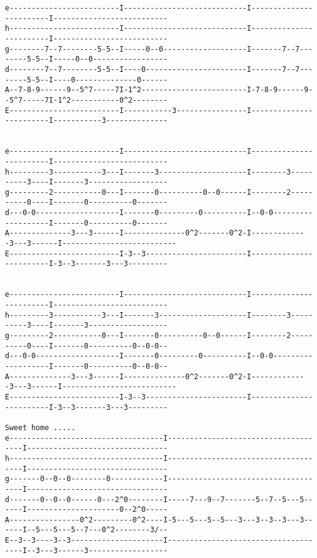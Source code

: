 \begin{verbatim}
e-------------------------I----------------------------I------------------------I--------------------------
h-------------------------I----------------------------I------------------------I--------------------------
g--------7--7--------5-5--I-----0--0-------------------I-------7--7--------5-5--I-----0--0-----------------
d--------7--7--------5-5--I----0-----------------------I-------7--7--------5-5--I----0--------------0------
A--7-8-9------9--5^7-----7I-1^2------------------------I-7-8-9------9--5^7-----7I-1^2-----------0^2--------
E-------------------------I-----------3----------------I------------------------I-----------3--------------


e-------------------------I----------------------------I------------------------I--------------------------
h---------3-----------3---I-------3--------------------I--------3----------3----I-------3------------------
g---------2-----------0---I-------0----------0--0------I--------2----------0----I-------0----------0-------
d---0-0-------------------I-------0---------0----------I--0-0-------------------I-------0----------0-------
A--------------3---3------I--------------0^2-------0^2-I-------------3---3------I--------------------------
E-------------------------I-3--3-----------------------I------------------------I-3--3-------3---3---------


e-------------------------I----------------------------I------------------------I--------------------------
h---------3-----------3---I-------3--------------------I--------3----------3----I-------3------------------
g---------2-----------0---I-------0----------0--0------I--------2----------0----I-------0----------0--0-0--
d---0-0-------------------I-------0---------0----------I--0-0-------------------I-------0----------0--0-0--
A--------------3---3------I--------------0^2-------0^2-I-------------3---3------I--------------------------
E-------------------------I-3--3-----------------------I------------------------I-3--3-------3---3---------

Sweet home .....
e-----------------------------------I-------------------------------------I--------------------------------
h-----------------------------------I-------------------------------------I--------------------------------
g-------0--0--0--------0------------I-------------------------------------I--------------------------------
d-------0--0--0------0---2^0--------I-----7---9--7-------5--7--5---5------I---------------------0--2^0-----
A----------------0^2---------0^2----I-5---5---5--5---3---3--3--3---3------I--5---5---5--7---0^2--------3/--
E--3--3----3--3---------------------I-------------------------------------I--3---3------3------------------



\end{verbatim}
